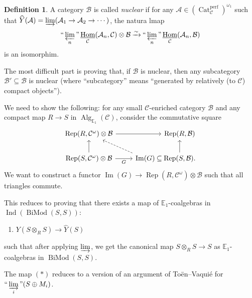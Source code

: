 \documentclass[draft]{amsart}
\newcommand{\EE}{\mathbb{E}}
\newcommand{\ul}[1]{\underline{#1}}
\newcommand{\wh}[1]{\widehat{#1}}
\newcommand{\cat}[1]{\mathcal{#1}}
\newcommand{\isoto}{\mathbin{\xrightarrow{\sim}}}
\DeclareMathOperator{\iHom}{\ul{Hom}}
\DeclareMathOperator{\Ind}{Ind}
\DeclareMathOperator{\Cat}{Cat}
\DeclareMathOperator{\Image}{Im}
\DeclareMathOperator{\BiMod}{BiMod}
\DeclareMathOperator{\Rep}{Rep}
\DeclareMathOperator{\Alg}{Alg}
\DeclareMathOperator*{\indinjlim}{\text{``}\varinjlim\text{''}} %
\DeclareMathOperator*{\indprojlim}{\text{``}\varprojlim\text{''}} %
\theoremstyle{definition}
\newtheorem{defn}[thm]{Definition}
\begin{document}
\begin{defn}
A category $\cat B$ is called \emph{nuclear} if for any $\cat A \in (\Cat_{\cat C}^{\mathrm{perf}})^{\omega_1}$ such that $\wh{Y}(\cat A) = \varinjlim (\cat A_1\to \cat A_2\to \dotsb)$, the natura lmap
\[
\indprojlim_n \iHom_{\cat C}(\cat A_n, \cat C)\otimes \cat B \isoto \indprojlim_n \iHom_{\cat C}(\cat A_n,\cat B)
\]
is an isomorphim.
\end{defn}

The most difficult part is proving that, if $\cat B$ is nuclear, then any subcategory $\cat B' \subseteq \cat B$ is nuclear (where \enquote{subcategory} means \enquote{generated by relatively (to $\cat C$) compact objects}).

We need to show the following: for any small $\cat C$-enriched category $\cat B$ and any compact map $R\to S$ in $\Alg_{\EE_1}(\cat C)$, consider the commutative square
\[
\begin{tikzcd}
\Rep(R,\cat C^\omega) \otimes \cat B \ar[rr] & &[-2em] \Rep(R, \cat B) \\
\Rep(S, \cat C^\omega)\otimes \cat B \ar[r,"G"'] \ar[u] & \Image(G) \ar[r,phantom, "\subseteq"] \ar[ul,dashed] & \Rep(S, \cat B) \ar[u].
\end{tikzcd}
\]
We want to construct a functor $\Image(G) \to \Rep(R, \cat C^\omega)\otimes \cat B$ such that all triangles commute.

This reduces to proving that there exists a map of $\EE_1$-coalgebras in $\Ind(\BiMod(S,S))$:
\begin{enumerate}[($*$)]
\item $Y(S\otimes_RS) \to \wh{Y}(S)$ 
\end{enumerate}
such that after applying $\varinjlim$, we get the canonical map $S\otimes_RS\to S$ as $\EE_1$-coalgebras in $\BiMod(S,S)$.

The map $(*)$ reduces to a version of an argument of To\"en--Vaqui\'e for $\indinjlim\limits_i (S\oplus M_i)$.
\end{document}
